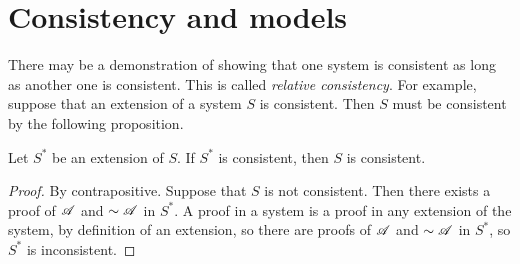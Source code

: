 \section{Consistency and models}

There may be a demonstration of showing that one system is consistent as long as another one is consistent. This is called \textit{relative consistency}. For example, suppose that an extension of a system \(S\) is consistent. Then \(S\) must be consistent by the following proposition.

\setcounter{definition}{10}
\begin{proposition}
  Let \(S^*\) be an extension of \(S\). If \(S^*\) is consistent, then \(S\) is consistent.

  \begin{proof}
    By contrapositive. Suppose that \(S\) is not consistent. Then there exists a proof of \(\mathscr{A}\) and \(\sim\mathscr{A}\) in \(S^*\). A proof in a system is a proof in any extension of the system, by definition of an extension, so there are proofs of \(\mathscr{A}\) and \(\sim\mathscr{A}\) in \(S^*\), so \(S^*\) is inconsistent.
  \end{proof}
\end{proposition}
